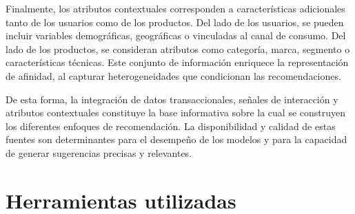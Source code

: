 Finalmente, los atributos contextuales corresponden a características adicionales tanto de los usuarios como de los productos. Del lado de los usuarios, se pueden incluir variables demográficas, geográficas o vinculadas al canal de consumo. Del lado de los productos, se consideran atributos como categoría, marca, segmento o características técnicas. Este conjunto de información enriquece la representación de afinidad, al capturar heterogeneidades que condicionan las recomendaciones.

De esta forma, la integración de datos transaccionales, señales de interacción y atributos contextuales constituye la base informativa sobre la cual se construyen los diferentes enfoques de recomendación. La disponibilidad y calidad de estas fuentes son determinantes para el desempeño de los modelos y para la capacidad de generar sugerencias precisas y relevantes.



\section{Herramientas utilizadas}




